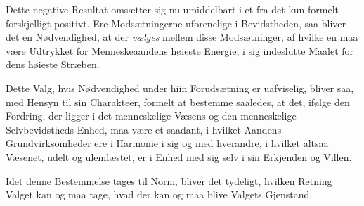  Dette negative Resultat omsætter sig nu umiddelbart i et fra det kun formelt
forskjelligt positivt. Ere Modsætningerne uforenelige i Bevidstheden, saa
bliver det en Nødvendighed, at der \emph{vælges} mellem disse Modsætninger, af
hvilke en maa være Udtrykket for Menneskeaandens høieste Energie, i sig
indeslutte Maalet for dens høieste Stræben.

Dette Valg, hvis Nødvendighed under hiin Forudsætning er uafviselig, bliver
saa, med Hensyn til sin Charakteer, formelt at bestemme saaledes, at det,
ifølge den Fordring, der ligger i det menneskelige Væsens og den menneskelige
Selvbevidstheds Enhed, maa være et saadant, i hvilket Aandens
Grundvirksomheder ere i Harmonie i sig og med hverandre, i hvilket altsaa
Væsenet, udelt og ulemlæstet, er i Enhed med sig selv i sin Erkjenden og
Villen.

Idet denne Bestemmelse tages til Norm, bliver det tydeligt, hvilken Retning
Valget kan og maa tage, hvad der kan og maa blive Valgets Gjenstand.

